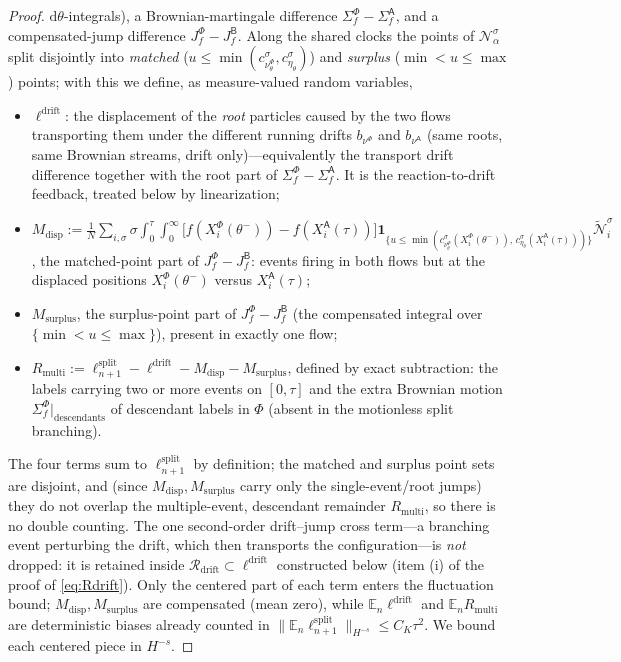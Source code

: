 \documentclass[a4paper,fleqn]{cas-sc}
\theoremstyle{definition}
\theoremstyle{remark}
\begin{document}
\begin{proof}
$\mathrm d\theta$-integrals), a Brownian-martingale difference
$\Sigma^\Phi_f-\Sigma^{\mathsf A}_f$, and a compensated-jump difference
$J^\Phi_f-J^{\mathsf B}_f$. Along the shared clocks the points of $\mathcal N^\sigma_\alpha$
split disjointly into \emph{matched}
($u\le\min(c^\sigma_{\nu^\Phi_\theta},c^\sigma_{\eta_\theta})$) and \emph{surplus}
($\min<u\le\max$) points; with this we define, as measure-valued random variables,
\begin{itemize}
\item $\ell^{\mathrm{drift}}$: the displacement of the \emph{root} particles caused
by the two flows transporting them under the different running drifts
$b_{\nu^\Phi}$ and $b_{\nu^{\mathsf A}}$ (same roots, same Brownian streams, drift
only)—equivalently the transport drift difference together with the root part of
$\Sigma^\Phi_f-\Sigma^{\mathsf A}_f$. It is the reaction-to-drift feedback, treated
below by linearization;
\item $M_{\mathrm{disp}}:=\tfrac1N\sum_{i,\sigma}\sigma\!\int_0^\tau\!\!\int_0^\infty\!
\bigl[f(X^\Phi_i(\theta^-))-f(X^{\mathsf A}_i(\tau))\bigr]\mathbf 1_{\{u\le\min(c^\sigma_{\nu^\Phi_\theta}(X^\Phi_i(\theta^-)),\,c^\sigma_{\eta_\theta}(X^{\mathsf A}_i(\tau)))\}}\widetilde{\mathcal N}^\sigma_i$,
the matched-point part of $J^\Phi_f-J^{\mathsf B}_f$: events firing in both flows but
at the displaced positions $X^\Phi_i(\theta^-)$ versus $X^{\mathsf A}_i(\tau)$;
\item $M_{\mathrm{surplus}}$, the surplus-point part of $J^\Phi_f-J^{\mathsf B}_f$
(the compensated integral over $\{\min<u\le\max\}$), present in exactly one flow;
\item $R_{\mathrm{multi}}:=\ell^{\mathrm{split}}_{n+1}-\ell^{\mathrm{drift}}-M_{\mathrm{disp}}-M_{\mathrm{surplus}}$,
defined by exact subtraction: the labels carrying two or more events on $[0,\tau]$
and the extra Brownian motion $\Sigma^\Phi_f|_{\text{descendants}}$ of descendant
labels in $\Phi$ (absent in the motionless split branching).
\end{itemize}
The four terms sum to $\ell^{\mathrm{split}}_{n+1}$ by definition; the matched and
surplus point sets are disjoint, and (since $M_{\mathrm{disp}},M_{\mathrm{surplus}}$
carry only the single-event/root jumps) they do not overlap the multiple-event,
descendant remainder $R_{\mathrm{multi}}$, so there is no double counting. The one
second-order drift--jump cross term—a branching event perturbing the drift, which
then transports the configuration—is \emph{not} dropped: it is retained inside
$\mathcal R_{\mathrm{drift}}\subset\ell^{\mathrm{drift}}$ constructed below (item (i) of
the proof of \eqref{eq:Rdrift}). Only the centered part of each term enters the
fluctuation bound; $M_{\mathrm{disp}},M_{\mathrm{surplus}}$ are compensated (mean
zero), while $\mathbb E_n\ell^{\mathrm{drift}}$ and $\mathbb E_nR_{\mathrm{multi}}$ are
deterministic biases already counted in
$\|\mathbb E_n\ell^{\mathrm{split}}_{n+1}\|_{H^{-s}}\le C_K\tau^2$. We bound each
centered piece in $H^{-s}$.


\end{proof}
\end{document}
